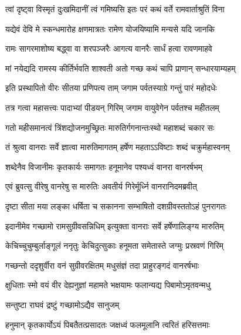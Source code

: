 \twolineshloka
{त्वां दृष्ट्वा विस्मृतं दुःखमिदानीं त्वं गमिष्यसि}
{इतः परं कथं वर्ते रामवार्ताश्रुतिं विना} %


\twolineshloka
{यद्येवं देवि मे स्कन्धमारोह क्षणमात्रतः}
{रामेण योजयिष्यामि मन्यसे यदि जानकि} %


\twolineshloka
{रामः सागरमाशोष्य बद्ध्वा वा शरपञ्जरैः}
{आगत्य वानरैः सार्धं हत्वा रावणमाहवे} %

\twolineshloka
{मां नयेद्यदि रामस्य कीर्तिर्भवति शाश्वती}
{अतो गच्छ कथं चापि प्राणान् सन्धारयाम्यहम्} %

\twolineshloka
{इति प्रस्थापितो वीरः सीतया प्रणिपत्य ताम्}
{जगाम पर्वतस्याग्रे गन्तुं पारं महोदधेः} %

\twolineshloka
{तत्र गत्वा महासत्त्वः पादाभ्यां पीडयन् गिरिम्}
{जगाम वायुवेगेन पर्वतश्च महीतलम्} %

\twolineshloka
{गतो महीसमानत्वं त्रिंशद्योजनमुच्छ्रितः}
{मारुतिर्गगनान्तःस्थो महाशब्दं चकार सः} %

\twolineshloka
{तं श्रुत्वा वानराः सर्वे ज्ञात्वा मारुतिमागतम्}
{हर्षेण महताऽऽविष्टाः शब्दं चक्रुर्महास्वनम्} %

\twolineshloka
{शब्देनैव विजानीमः कृतकार्यः समागतः}
{हनूमानेव पश्यध्वं वानरा वानरर्षभम्} %

\twolineshloka
{एवं ब्रुवत्सु वीरेषु वानरेषु स मारुतिः}
{अवतीर्य गिरेर्मूर्ध्नि वानरानिदमब्रवीत्} %

\twolineshloka
{दृष्टा सीता मया लङ्का धर्षिता च सकानना}
{सम्भाषितो दशग्रीवस्ततोऽहं पुनरागतः} %

\twolineshloka
{इदानीमेव गच्छामो रामसुग्रीवसन्निधिम्}
{इत्युक्ता वानराः सर्वे हर्षेणालिङ्ग्य मारुतिम्} %

\twolineshloka
{केचिच्चुचुम्बुर्लाङ्गूलं ननृतुः केचिदुत्सुकाः}
{हनूमता समेतास्ते जग्मुः प्रस्रवणं गिरिम्} %

\twolineshloka
{गच्छन्तो ददृशुर्वीरा वनं सुग्रीवरक्षितम्}
{मधुसंज्ञं तदा प्राहुरङ्गदं वानरर्षभाः} %

\twolineshloka
{क्षुधिताः स्मो वयं वीर देह्यनुज्ञां महामते}
{भक्षयामः फलान्यद्य पिबामोऽमृतवन्मधु} %

\onelineshloka
{सन्तुष्टा राघवं द्रष्टुं गच्छामोऽद्यैव सानुजम्} %


\twolineshloka
{हनुमान् कृतकार्योऽयं पिबतैतत्प्रसादतः}
{जक्षध्वं फलमूलानि त्वरितं हरिसत्तमाः} %

